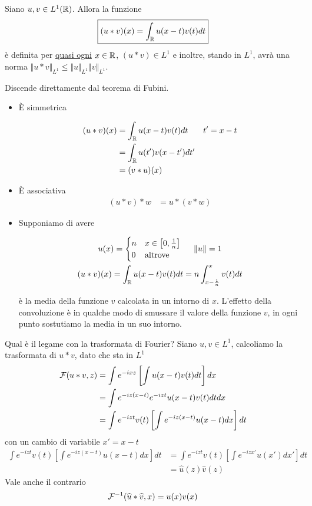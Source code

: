 \begin{thm}
Siano $u, v\in L^{1}(\mathbb{R})$. Allora la funzione
\begin{equation*}
\boxed{(u*v)(x) = \int_{\mathbb{R}} u(x - t) v(t) dt}
\end{equation*}
è definita per \underline{quasi ogni} $x\in \mathbb{R}$, $(u*v) \in L^{1}$ e inoltre, stando in $L^{1}$, avrà una norma $ \Vert u*v \Vert_{L^{1}} \leq \Vert u \Vert_{L^{1}} \Vert v \Vert_{L^{1}}$.
\end{thm}
Discende direttamente dal teorema di Fubini.
\begin{itemize}
\item È simmetrica

\begin{equation*}
\begin{aligned}
(u*v)(x) & = \int_{\mathbb{R}} u(x - t) v(t) dt & t'= x - t\\
 & = \int_{\mathbb{R}} u(t') v(x - t') dt' & \\
 & = (v*u)(x) &
\end{aligned}
\end{equation*}
\item È associativa
\begin{align*}
(u*v) *w & = u*(v*w)
\end{align*}
\item Supponiamo di avere

\begin{gather*}
u(x) =
\begin{cases}
n & x\in \left[0, \frac{1}{n}\right]\\
0 & \text{altrove}
\end{cases} \ \ \ \ \Vert u \Vert = 1\\
(u*v)(x) = \int_{\mathbb{R}} u(x - t) v(t) dt = n\int^{x}_{x - \frac{1}{n}} v(t) dt
\end{gather*}

è la media della funzione $v$ calcolata in un intorno di $x$. L'effetto della convoluzione è in qualche modo di smussare il valore della funzione $v$, in ogni punto sostutiamo la media in un suo intorno.
\end{itemize}

Qual è il legame con la trasformata di Fourier? Siano $u, v\in L^{1}$, calcoliamo la trasformata di $u*v$, dato che sta in $L^{1}$
\begin{align*}
\mathcal{F}(u*v, z) & = \int e^{- ixz}\left[\int u(x - t) v(t) dt\right] dx\\
 & = \int e^{- iz(x - t)} e^{- izt} u(x - t) v(t) dtdx\\
 & = \int e^{- izt} v(t)\left[\int e^{- iz(x - t)} u(x - t) dx\right] dt
\end{align*}
con un cambio di variabile $x'= x - t$
\begin{align*}
\int e^{- izt} v(t)\left[\int e^{- iz(x - t)} u(x - t) dx\right] dt & = \int e^{- izt} v(t)\left[\int e^{- izx'} u(x') dx'\right] dt\\
 & = \hat{u}(z)\hat{v}(z)
\end{align*}
Vale anche il contrario
\begin{equation*}
\mathcal{F}^{- 1}(\widehat{u} *\widehat{v}, x) = u(x) v(x)
\end{equation*}

